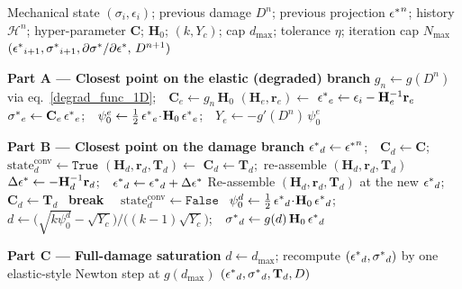 \documentclass[10pt,review]{cas-sc}
\begin{document}
\begin{algorithm}[h]
	\begin{algorithmic}[1]
		\Require Mechanical state $(\sigma_i,\epsilon_i)$; previous damage $D^n$; previous projection $\mbox{$\epsilon^*$}^n$;
		history $\mathcal{H}^n$; hyper-parameter $\mathbf{C}$; $\mathbf{H}_0$; $(k,Y_c)$;
		cap $d_{\max}$; tolerance $\eta$; iteration cap $N_{\max}$
		\Ensure   $(\mbox{$\epsilon^*$}_{i+1},\mbox{$\sigma^*$}_{i+1},\partial\mbox{$\sigma^*$}/\partial\mbox{$\epsilon^*$},\,D^{n+1})$
		
		\Statex \textbf{Part A --- Closest point on the elastic (degraded) branch}
		\State $g_n \gets g(D^n)$ via eq.~\eqref{degrad_func_1D};\ \ $\mathbf{C}_e \gets g_n\,\mathbf{H}_0$
		\State $(\mathbf{H}_e,\mathbf{r}_e)\gets$ 
		\State $\mbox{$\epsilon^*$}_e \gets \epsilon_i - \mathbf{H}_e^{-1}\mathbf{r}_e$
		\State $\mbox{$\sigma^*$}_e \gets \mathbf{C}_e\,\mbox{$\epsilon^*$}_e$;\ \ $\psi_0^e \gets \tfrac12\,\mbox{$\epsilon^*$}_e\!\cdot\!\mathbf{H}_0\,\mbox{$\epsilon^*$}_e$;\ \ $Y_e \gets -g'(D^n)\,\psi_0^e$
		
		\Statex \textbf{Part B --- Closest point on the damage branch}
		\State $\mbox{$\epsilon^*$}_d \gets \mbox{$\epsilon^*$}^n$;\ \ $\mathbf{C}_d \gets \mathbf{C}$;\ \ $\mathrm{state}_d^{\text{conv}}\gets\texttt{True}$
		\State $(\mathbf{H}_d,\mathbf{r}_d,\mathbf{T}_d) \gets$ 
		\State $\mathbf{C}_d \gets \mathbf{T}_d$;\ re-assemble $(\mathbf{H}_d,\mathbf{r}_d,\mathbf{T}_d)$
		\State $\Delta\mbox{$\epsilon^*$} \gets -\mathbf{H}_d^{-1}\mathbf{r}_d$;\ \ $\mbox{$\epsilon^*$}_d \gets \mbox{$\epsilon^*$}_d + \Delta\mbox{$\epsilon^*$}$
		\State Re-assemble $(\mathbf{H}_d,\mathbf{r}_d,\mathbf{T}_d)$ at the new $\mbox{$\epsilon^*$}_d$;\ \ $\mathbf{C}_d \gets \mathbf{T}_d$
		\If{$\|\Delta\epsst\| < \eta$}\ \textbf{break}\ \EndIf
		\EndFor
		\ $\mathrm{state}_d^{\text{conv}}\gets\texttt{False}$\ \EndIf
		\State $\psi_0^d \gets \tfrac12\,\mbox{$\epsilon^*$}_d\!\cdot\!\mathbf{H}_0\,\mbox{$\epsilon^*$}_d$;\ \ $d \gets \big(\sqrt{k\psi_0^d}-\sqrt{Y_c}\big)/\big((k-1)\sqrt{Y_c}\big)$;\ \ $\mbox{$\sigma^*$}_d \gets g(d)\,\mathbf{H}_0\,\mbox{$\epsilon^*$}_d$
		
		\Statex \textbf{Part C --- Full-damage saturation}
		\State $d \gets d_{\max}$; recompute $(\mbox{$\epsilon^*$}_d,\mbox{$\sigma^*$}_d)$ by one elastic-style Newton step at $g(d_{\max})$
		\State \Return $(\mbox{$\epsilon^*$}_d,\mbox{$\sigma^*$}_d,\mathbf{T}_d,D)$
		\EndIf
		

\end{algorithmic}
\end{algorithm}
\end{document}
